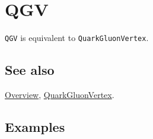 \documentclass[../FeynCalcManual.tex]{subfiles}
\begin{document}
\hypertarget{qgv}{%
\section{QGV}\label{qgv}}

\texttt{QGV} is equivalent to \texttt{QuarkGluonVertex}.

\subsection{See also}

\hyperlink{toc}{Overview},
\hyperlink{quarkgluonvertex}{QuarkGluonVertex}.

\subsection{Examples}
\end{document}
